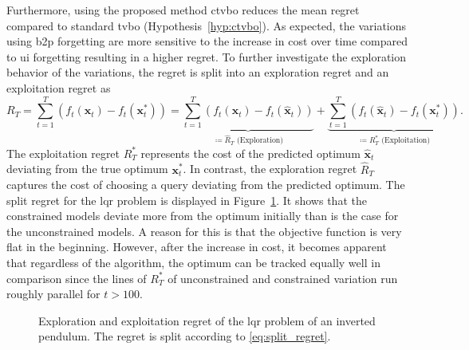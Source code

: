 Furthermore, using the proposed method \gls{ctvbo} reduces the mean regret compared to standard \gls{tvbo} (Hypothesis~\ref{hyp:ctvbo}). As expected, the variations using \gls{b2p} forgetting are more sensitive to the increase in cost over time compared to \gls{ui} forgetting resulting in a higher regret. To further investigate the exploration behavior of the variations, the regret is split into an exploration regret and an exploitation regret as
\begin{equation}
    R_T = \sum_{t=1}^T \left(f_t(\mathbf{x}_t) - f_t(\mathbf{x}_t^*)\right) = \underbrace{\sum_{t=1}^T \left(f_t(\mathbf{x}_t) - f_t(\mathbf{\hat{x}}_t)\right)}_{\coloneqq \hat{R}_T \text{ (Exploration)}} + \underbrace{\sum_{t=1}^T \left(f_t(\mathbf{\hat{x}}_t) - f_t(\mathbf{x}_t^*)\right)}_{\coloneqq R_T^* \text{ (Exploitation)}}.
    \label{eq:split_regret}
\end{equation}
The exploitation regret $R_T^*$ represents the cost of the predicted optimum $\mathbf{\hat{x}}_t$ deviating from the true optimum $\mathbf{x}_t^*$. In contrast, the exploration regret $\hat{R}_T$ captures the cost of choosing a query deviating from the predicted optimum. The split regret for the \gls{lqr} problem is displayed in Figure~\ref{fig:LQR_split_regret}. It shows that the constrained models deviate more from the optimum initially than is the case for the unconstrained models. A reason for this is that the objective function is very flat in the beginning. However, after the increase in cost, it becomes apparent that regardless of the algorithm, the optimum can be tracked equally well in comparison since the lines of $R_T^*$ of unconstrained and constrained variation run roughly parallel for $t>100$.
\begin{figure}[h]
    \centering
    
    \caption[Exploration and exploitation regret of the \gls{lqr} problem of an inverted pendulum.]{Exploration and exploitation regret of the \gls{lqr} problem of an inverted pendulum. The regret is split according to \eqref{eq:split_regret}.}
    \label{fig:LQR_split_regret}
\end{figure}

